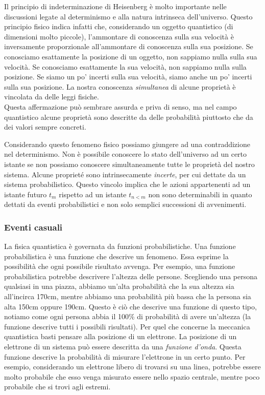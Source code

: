 \documentclass[a4paper, 12pt]{article}
\begin{document}
Il principio di indeterminazione di Heisenberg è molto importante nelle discussioni
legate al determinismo e alla natura intrinseca dell'universo.
Questo principio fisico indica infatti che, considerando un oggetto quantistico (di dimensioni molto piccole),
l'ammontare di conoscenza sulla sua velocità è inversamente proporzionale all'ammontare
di conoscenza sulla sua posizione.
Se conosciamo esattamente la posizione di un oggetto, non sappiamo nulla sulla sua velocità.
Se conosciamo esattamente la sua velocità, non sappiamo nulla sulla posizione. Se siamo un po'
incerti sulla sua velocità, siamo anche un po' incerti sulla sua posizione.
La nostra conoscenza \textit{simultanea} di alcune proprietà è vincolata da delle leggi fisiche. \\
Questa affermazione può sembrare assurda e priva di senso, ma nel campo quantistico
alcune proprietà sono descritte da delle probabilità piuttosto che da dei valori sempre concreti.

Considerando questo fenomeno fisico possiamo giungere ad una contraddizione nel determinismo.
Non è possibile conoscere lo stato dell'universo ad un certo istante se non possiamo
conoscere simultaneamente tutte le proprietà del nostro sistema.
Alcune proprieté sono intrinsecamente \textit{incerte}, per cui
dettate da un sistema probabilistico. Questo vincolo implica che
le azioni appartenenti ad un istante futuro \(t_m\) rispetto ad un istante
\(t_{n < m}\) non sono determinabili in quanto dettati da eventi probabilistici
e non solo semplici successioni di avvenimenti.

\subsubsection{Eventi casuali}

La fisica quantistica è governata da funzioni probabilistiche.
Una funzione probabilistica è una funzione che descrive un fenomeno. Essa
esprime la possibilità che ogni possibile risultato avvenga. Per esempio,
una funzione probabilistica potrebbe descrivere l'altezza delle persone.
Scegliendo una persona qualsiasi in una piazza, abbiamo un'alta probabilità che la sua altezza
sia all'incirca 170cm, mentre abbiamo una probabilità più bassa che la persona sia alta 150cm oppure 190cm.
Questo è ciò che descrive una funzione di questo tipo, notiamo come ogni persona abbia il 100\% di probabilità
di avere un'altezza (la funzione descrive tutti i possibili risultati).
Per quel che concerne la meccanica quantistica basti pensare alla posizione di un elettrone. La posizione di un elettrone
di un sistema può essere descritta da una \textit{funzione d'onda}. Questa funzione descrive
la probabilità di misurare l'elettrone in un certo punto. Per esempio, considerando un elettrone libero
di trovarsi su una linea, potrebbe essere molto probabile che esso venga misurato essere nello spazio centrale, mentre
poco probabile che si trovi agli estremi.
\end{document}
